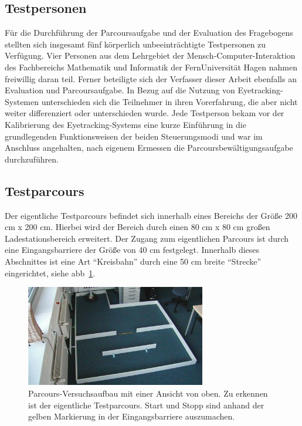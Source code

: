 \subsection{Testpersonen}
Für die Durchführung der Parcoursaufgabe und der Evaluation des Fragebogens stellten sich insgesamt fünf körperlich unbeeinträchtigte Testpersonen zu Verfügung. Vier Personen aus dem Lehrgebiet der Mensch-Computer-Interaktion des Fachbereichs Mathematik und Informatik der FernUniversität Hagen nahmen freiwillig daran teil. Ferner beteiligte sich der Verfasser dieser Arbeit ebenfalls an Evaluation und Parcoursaufgabe. In Bezug auf die Nutzung von Eyetracking-Systemen unterschieden sich die Teilnehmer in ihren Vorerfahrung, die aber nicht weiter differenziert oder unterschieden wurde. Jede Testperson bekam vor der Kalibrierung des Eyetracking-Systems eine kurze Einführung in die grundlegenden Funktionsweisen der beiden Steuerungsmodi und war im Anschluss angehalten, nach eigenem Ermessen die Parcoursbewältigungsaufgabe durchzuführen.

\subsection{Testparcours}
Der eigentliche Testparcours befindet sich innerhalb eines Bereichs der Größe 200 cm x 200 cm. Hierbei wird der Bereich durch einen 80 cm x 80 cm großen Ladestationsbereich erweitert. Der Zugang zum eigentlichen Parcours ist durch eine Eingangsbarriere der Größe von 40 cm festgelegt. Innerhalb dieses Abschnittes ist eine Art \enquote{Kreisbahn} durch eine 50 cm breite \enquote{Strecke} eingerichtet, siehe \acs{abb}~\ref{fig:aufbau}.

\begin{figure}[ht]
\begin{center}
\includegraphics[width=0.7\textwidth]{bilder/evaluation/TopView.png}\hfill
\end{center}
\caption{Parcours-Versuchsaufbau mit einer Ansicht von oben. Zu erkennen ist der eigentliche Testparcours. Start und Stopp sind anhand der gelben Markierung in der Eingangsbarriere auszumachen.}
\label{fig:aufbau}
\end{figure}


